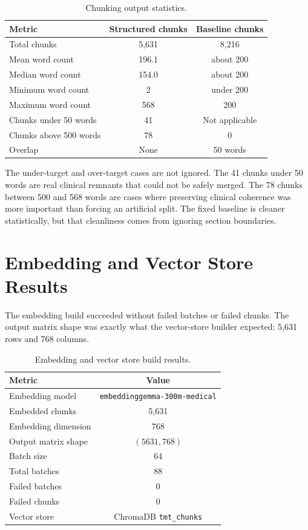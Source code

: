 \begin{table}[htbp]
\centering
\caption{Chunking output statistics.}
\label{tab:chunking_results}
\begin{tabular}{p{} c c}
\toprule
\textbf{Metric} & \textbf{Structured chunks} & \textbf{Baseline chunks}\\
\midrule
Total chunks & 5,631 & 8,216\\
Mean word count & 196.1 & about 200\\
Median word count & 154.0 & about 200\\
Minimum word count & 2 & under 200\\
Maximum word count & 568 & 200\\
Chunks under 50 words & 41 & Not applicable\\
Chunks above 500 words & 78 & 0\\
Overlap & None & 50 words\\
\bottomrule
\end{tabular}
\end{table}

The under-target and over-target cases are not ignored. The 41 chunks under 50 words are real clinical remnants that could not be safely merged. The 78 chunks between 500 and 568 words are cases where preserving clinical coherence was more important than forcing an artificial split. The fixed baseline is cleaner statistically, but that cleanliness comes from ignoring section boundaries.

\section{Embedding and Vector Store Results}

The embedding build succeeded without failed batches or failed chunks. The output matrix shape was exactly what the vector-store builder expected: 5,631 rows and 768 columns.

\begin{table}[htbp]
\centering
\caption{Embedding and vector store build results.}
\label{tab:embedding_results}
\begin{tabular}{p{} c}
\toprule
\textbf{Metric} & \textbf{Value}\\
\midrule
Embedding model & \texttt{embeddinggemma-300m-medical}\\
Embedded chunks & 5,631\\
Embedding dimension & 768\\
Output matrix shape & $(5631, 768)$\\
Batch size & 64\\
Total batches & 88\\
Failed batches & 0\\
Failed chunks & 0\\
Vector store & ChromaDB \texttt{tmt\_chunks}\\
\bottomrule
\end{tabular}
\end{table}

